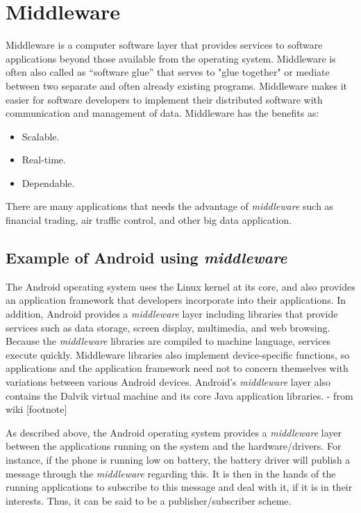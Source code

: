 \section{Middleware}
Middleware is a computer software layer that provides services to software applications beyond those available from the operating system. Middleware is often also called as “software glue” that serves to "glue together" or mediate between two separate and often already existing programs. Middleware makes it easier for software developers to implement their distributed software with communication and management of data.
Middleware has the benefits as:

\begin{itemize}
\item Scalable.
\item Real-time.
\item Dependable.
\end{itemize}

There are many applications that needs the advantage of \emph{middleware} such as financial trading, air traffic control, and other big data application.

\subsection{Example of Android using \emph{middleware}}
The Android operating system uses the Linux kernel at its core, and also provides an application framework that developers incorporate into their applications. In addition, Android provides a \emph{middleware} layer including libraries that provide services such as data storage, screen display, multimedia, and web browsing. Because the \emph{middleware} libraries are compiled to machine language, services execute quickly. Middleware libraries also implement device-specific functions, so applications and the application framework need not to concern themselves with variations between various Android devices. Android’s \emph{middleware} layer also contains the Dalvik virtual machine and its core Java application libraries. - from wiki [footnote]

As described above, the Android operating system provides a \emph{middleware} layer between the applications running on the system and the hardware/drivers. For instance, if the phone is running low on battery, the battery driver will publish a message through the \emph{middleware} regarding this. It is then in the hands of the running applications to subscribe to this message and deal with it, if it is in their interests. Thus, it can be said to be a publisher/subscriber scheme.

